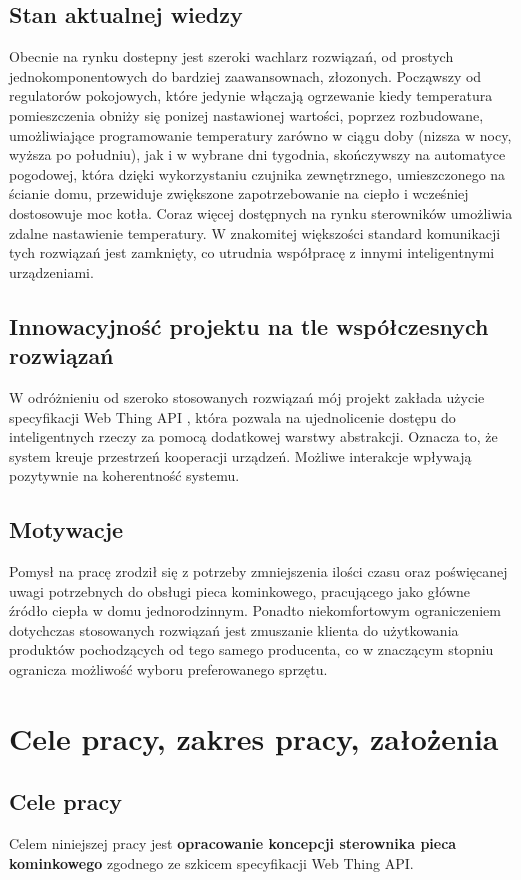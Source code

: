 \documentclass[12pt]{report}
\begin{document}
 \section{Stan aktualnej wiedzy}
 Obecnie na rynku dostepny jest szeroki wachlarz rozwiązań, od prostych jednokomponentowych do bardziej zaawansownach, złozonych. Począwszy od regulatorów pokojowych, które jedynie włączają ogrzewanie kiedy temperatura pomieszczenia obniży się ponizej nastawionej wartości, poprzez rozbudowane, umożliwiające programowanie temperatury zarówno w ciągu doby (nizsza w nocy, wyższa po południu), jak i w wybrane dni tygodnia, skończywszy na automatyce pogodowej, która dzięki wykorzystaniu czujnika zewnętrznego, umieszczonego na ścianie domu, przewiduje zwiększone zapotrzebowanie na ciepło i wcześniej dostosowuje moc kotła.
 Coraz więcej dostępnych na rynku sterowników umożliwia zdalne nastawienie temperatury. W znakomitej większości standard komunikacji tych rozwiązań jest zamknięty, co utrudnia współpracę  z innymi inteligentnymi urządzeniami.
 \section{Innowacyjność projektu na tle współczesnych rozwiązań}
 W odróżnieniu od szeroko stosowanych rozwiązań mój projekt zakłada użycie specyfikacji Web Thing API \cite{Mazurek2018}, która pozwala na ujednolicenie dostępu do inteligentnych rzeczy za pomocą dodatkowej warstwy abstrakcji. Oznacza to, że system kreuje przestrzeń kooperacji urządzeń. Możliwe interakcje wpływają pozytywnie na koherentność systemu.
 
 
 \section{Motywacje}
Pomysł na pracę zrodził się z potrzeby zmniejszenia ilości czasu oraz poświęcanej uwagi potrzebnych do obsługi pieca kominkowego, pracującego jako główne źródło ciepła w domu jednorodzinnym. Ponadto niekomfortowym ograniczeniem dotychczas stosowanych rozwiązań jest zmuszanie klienta do użytkowania produktów pochodzących od tego samego producenta, co w znaczącym stopniu ogranicza możliwość wyboru preferowanego sprzętu.

 \chapter{Cele pracy, zakres pracy, założenia}

 \section{Cele pracy}
 Celem niniejszej pracy jest \textbf{opracowanie koncepcji sterownika pieca kominkowego} zgodnego ze szkicem specyfikacji Web Thing API.
 
\end{document}
